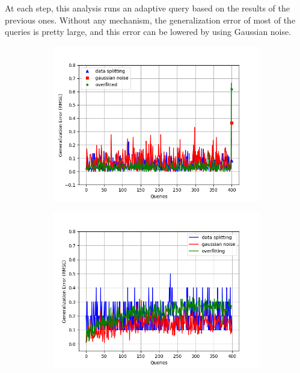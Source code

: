 At each step, this analysis runs an adaptive query based on the results of the previous ones. Without any mechanism, the generalization error of most of the queries is pretty large, and this error can be lowered by using Gaussian noise. 
{\small
\begin{figure}
\centering
\begin{subfigure}{.322\textwidth}
\begin{centering}
\includegraphics[width=1.0\textwidth]{tworound.png}
\caption{}
\end{centering}
\end{subfigure}
\quad
\begin{subfigure}{.322\textwidth}
\begin{centering}
\includegraphics[width=1.0\textwidth]{multipleround.png}

\end{centering}
\end{subfigure}
\end{figure}}
